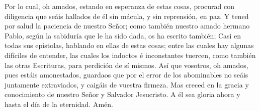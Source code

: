  Por lo cual, oh amados, estando en esperanza de estas
cosas, procurad con diligencia que seáis hallados de él sin mácula, y
sin reprensión, en paz.  Y tened por salud la paciencia de
nuestro Señor; como también nuestro amado hermano Pablo, según la
sabiduría que le ha sido dada, os ha escrito también;  Casi
en todas sus epístolas, hablando en ellas de estas cosas; entre las
cuales hay algunas difíciles de entender, las cuales los indoctos é
inconstantes tuercen, como también las otras Escrituras, para perdición
de sí mismos.  Así que vosotros, oh amados, pues estáis
amonestados, guardaos que por el error de los abominables no seáis
juntamente extraviados, y caigáis de vuestra firmeza.  Mas
creced en la gracia y conocimiento de nuestro Señor y Salvador
Jesucristo. A él sea gloria ahora y hasta el día de la eternidad. Amén.

